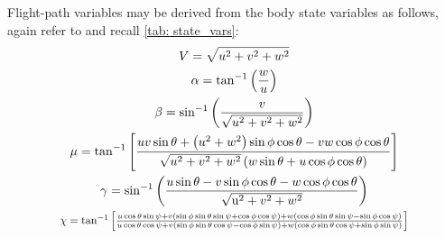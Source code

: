 \documentclass[12pt]{ucthesis}
\begin{document}
Flight-path variables may be derived from the body state variables as follows, again refer to \citep{WL-TR-96-3099} and recall \autoref{tab: state_vars}:
%
	\begin{gather}%
		V		=\sqrt{u^{2}+v^{2}+w^{2}} \label{eq: wind_v}\\
		\alpha 	=\tan^{-1}\left( \displaystyle \frac{w}{u} \right) \label{eq: wind_alpha} \\
		\beta	=\sin^{-1} \left( \displaystyle \frac{v}{\sqrt{u^{2}+v^{2}+w^{2}}} \right) \label{eq: wind_beta} \\
		\mu		=\tan^{-1} \left[ \displaystyle \frac{uv\sin\theta+ \left(u^2+w^2 \right) \sin\phi \cos\theta -vw\cos\phi \cos\theta}{\sqrt{u^2+v^2+w^2} \left( w\sin\theta + u\cos\phi \cos\theta \right)} \right] \label{eq: wind_mu} \\
		\gamma	=\sin^{-1} \left( \displaystyle \frac{u\sin\theta-v\sin\phi\cos\theta-w\cos\phi\cos\theta}{\sqrt{\mathrm{u}^{2}+v^{2}+w^{2}}} \right)
		\label{eq: wind_gam} \\
		\resizebox{.8\hsize}{!}{$ \chi=\tan^{-1} \left[ \frac{u\cos\theta\sin\psi+v \left( \sin\phi\sin\theta\sin\psi+\cos\phi\cos\psi \right) + w \left( \cos\phi \sin\theta \sin\psi - \sin\phi \cos\psi \right)}{u\cos\theta \cos\psi + v \left( \sin\phi \sin\theta \cos\psi - \cos\phi \sin\psi \right) + w \left( \cos\phi \sin\theta \cos\psi + \sin\phi \sin\psi \right)} \right]$} \label{eq: wind_chi}
	\end{gather}%
\end{document}
